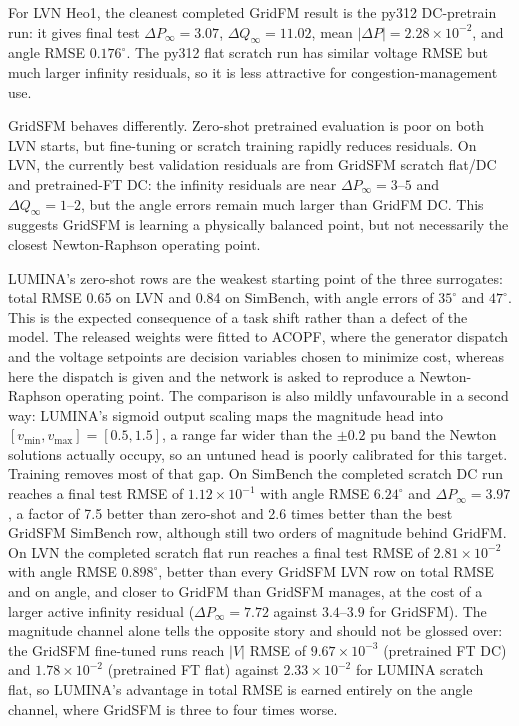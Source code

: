 \documentclass[10pt]{article}
\begin{document}
For LVN Heo1, the cleanest completed GridFM result is the py312 DC-pretrain run: it gives final test \(\Delta P_\infty=3.07\), \(\Delta Q_\infty=11.02\), mean \(|\Delta P|=2.28\times10^{-2}\), and angle RMSE \(0.176^\circ\). The py312 flat scratch run has similar voltage RMSE but much larger infinity residuals, so it is less attractive for congestion-management use.

GridSFM behaves differently. Zero-shot pretrained evaluation is poor on both LVN starts, but fine-tuning or scratch training rapidly reduces residuals. On LVN, the currently best validation residuals are from GridSFM scratch flat/DC and pretrained-FT DC: the infinity residuals are near \(\Delta P_\infty=3\text{--}5\) and \(\Delta Q_\infty=1\text{--}2\), but the angle errors remain much larger than GridFM DC. This suggests GridSFM is learning a physically balanced point, but not necessarily the closest Newton-Raphson operating point.

LUMINA's zero-shot rows are the weakest starting point of the three surrogates: total RMSE 0.65 on LVN and 0.84 on SimBench, with angle errors of $35^\circ$ and $47^\circ$. This is the expected consequence of a task shift rather than a defect of the model. The released weights were fitted to ACOPF, where the generator dispatch and the voltage setpoints are decision variables chosen to minimize cost, whereas here the dispatch is given and the network is asked to reproduce a Newton-Raphson operating point. The comparison is also mildly unfavourable in a second way: LUMINA's sigmoid output scaling maps the magnitude head into $[v_{\min}, v_{\max}] = [0.5, 1.5]$, a range far wider than the $\pm 0.2$ pu band the Newton solutions actually occupy, so an untuned head is poorly calibrated for this target. Training removes most of that gap. On SimBench the completed scratch DC run reaches a final test RMSE of \(1.12\times10^{-1}\) with angle RMSE \(6.24^\circ\) and \(\Delta P_\infty = 3.97\), a factor of 7.5 better than zero-shot and 2.6 times better than the best GridSFM SimBench row, although still two orders of magnitude behind GridFM. On LVN the completed scratch flat run reaches a final test RMSE of \(2.81\times10^{-2}\) with angle RMSE \(0.898^\circ\), better than every GridSFM LVN row on total RMSE and on angle, and closer to GridFM than GridSFM manages, at the cost of a larger active infinity residual (\(\Delta P_\infty = 7.72\) against \(3.4\text{--}3.9\) for GridSFM). The magnitude channel alone tells the opposite story and should not be glossed over: the GridSFM fine-tuned runs reach \(|V|\) RMSE of \(9.67\times10^{-3}\) (pretrained FT DC) and \(1.78\times10^{-2}\) (pretrained FT flat) against \(2.33\times10^{-2}\) for LUMINA scratch flat, so LUMINA's advantage in total RMSE is earned entirely on the angle channel, where GridSFM is three to four times worse.
\end{document}
